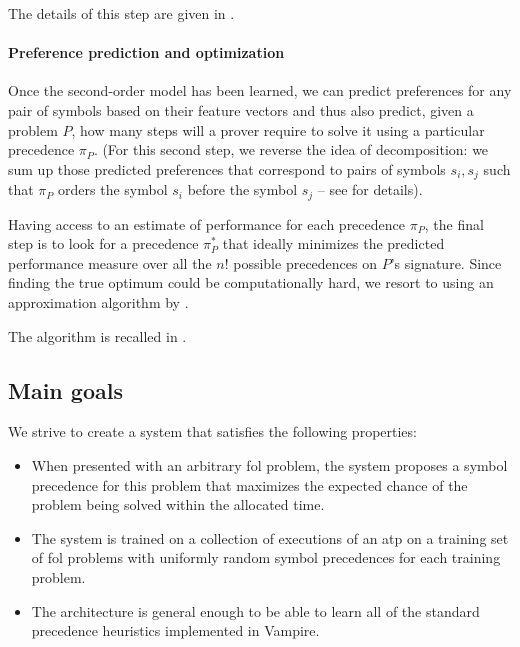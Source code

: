\documentclass[a4paper]{easychair}
\begin{document}
The details of this step are given in .

\paragraph{Preference prediction and optimization} Once the second-order model has been learned, we can predict 
preferences for any pair of symbols based on their feature vectors and thus also predict,
given a problem $P$, how many steps will a prover require to solve it using a particular precedence $\pi_P$.
(For this second step, we reverse the idea of decomposition:
we sum up those predicted preferences that correspond to pairs of symbols $s_i,s_j$
such that $\pi_P$ orders the symbol $s_i$ before the symbol $s_j$ -- see  for details).

Having access to an estimate of performance for each precedence $\pi_P$, the final step 
is to look for a precedence $\pi^*_P$ that ideally minimizes the predicted performance measure 
over all the $n!$ possible precedences on $P$'s signature. Since finding the true
optimum could be computationally hard, we resort to using an approximation algorithm by \citet{Cohen2011}.

The algorithm is recalled in .



\iffalse

\subsection{Main goals}

We strive to create a system that satisfies the following properties:

\begin{itemize}
	\item When presented with an arbitrary \gls{fol} problem,
	the system proposes a symbol precedence for this problem
	that maximizes the expected chance of the problem being solved
	within the allocated time.
	
	\item The system is trained on a collection of executions of an \gls{atp}
	on a training set of \gls{fol} problems
	with uniformly random symbol precedences for each training problem.
	
	\item The architecture is general enough to be able to learn
	all of the standard precedence heuristics implemented in Vampire.\cite{?}
\end{itemize}
\end{document}
